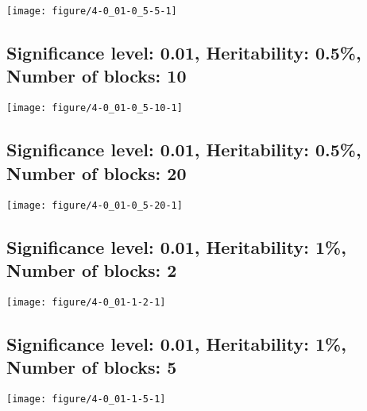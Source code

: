 \documentclass[11pt,letter]{article}\usepackage[]{graphicx}\usepackage[]{color}
\makeatletter
\def\maxwidth{ %
  \ifdim\Gin@nat@width>\linewidth
    \linewidth
  \else
    \Gin@nat@width
  \fi
}
\newenvironment{knitrout}{}{} %
\makeatother
\begin{document}
\begin{knitrout}
\color{fgcolor}
\texttt{[image: figure/4-0\_01-0\_5-5-1]} 

\end{knitrout}

\newpage
\subsection{Significance level: 0.01, Heritability: 0.5\%, Number of blocks: 10}

\begin{knitrout}
\color{fgcolor}
\texttt{[image: figure/4-0\_01-0\_5-10-1]} 

\end{knitrout}

\newpage
\subsection{Significance level: 0.01, Heritability: 0.5\%, Number of blocks: 20}

\begin{knitrout}
\color{fgcolor}
\texttt{[image: figure/4-0\_01-0\_5-20-1]} 

\end{knitrout}

\newpage
\subsection{Significance level: 0.01, Heritability: 1\%, Number of blocks: 2}

\begin{knitrout}
\color{fgcolor}
\texttt{[image: figure/4-0\_01-1-2-1]} 

\end{knitrout}

\newpage
\subsection{Significance level: 0.01, Heritability: 1\%, Number of blocks: 5}

\begin{knitrout}
\color{fgcolor}
\texttt{[image: figure/4-0\_01-1-5-1]} 

\end{knitrout}
\end{document}
